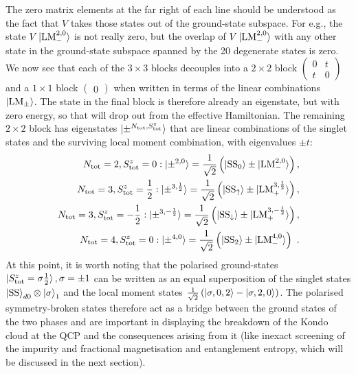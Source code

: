 \documentclass{iopart}
\begin{document}
The zero matrix elements at the far right of each line should be understood as the fact that \(V\) takes those states out of the ground-state subspace. For e.g., the state \(V\ket{\text{LM}_-^{2,0}}\) is not really zero, but the overlap of \(V\ket{\text{LM}_-^{2,0}}\) with any other state in the ground-state subspace spanned by the 20 degenerate states is zero. We now see that each of the \(3\times3\) blocks decouples into a \(2\times2\) block \(\begin{pmatrix} 0 & t \\ t & 0 \end{pmatrix} \)and a \(1\times1\) block \(\begin{pmatrix} 0 \end{pmatrix} \) when written in terms of the linear combinations \(\ket{\text{LM}_\pm}\). The state in the final block is therefore already an eigenstate, but with zero energy, so that will drop out from the effective Hamiltonian. The remaining \(2\times 2\) block has eigenstates \(\ket{\pm^{N_\text{tot},S_\text{tot}^z}}\) that are linear combinations of the singlet states and the surviving local moment combination, with eigenvalues \(\pm t\):
\begin{eqnarray}
	\label{new g-states}
	N_\text{tot} = 2, S_\text{tot}^z = 0: \ket{\pm^{2,0}} = \frac{1}{\sqrt 2}\left(\ket{\text{SS}_0} \pm \ket{\text{LM}_-^{2,0}}\right),\nonumber \\
	N_\text{tot} = 3, S_\text{tot}^z = \frac{1}{2}: \ket{\pm^{3,\frac{1}{2}}} = \frac{1}{\sqrt 2}\left(\ket{\text{SS}_\uparrow} \pm \ket{\text{LM}_+^{3,\frac{1}{2}}}\right),\nonumber \\
	N_\text{tot} = 3, S_\text{tot}^z = -\frac{1}{2}: \ket{\pm^{3,-\frac{1}{2}}} = \frac{1}{\sqrt 2}\left(\ket{\text{SS}_\downarrow} \pm \ket{\text{LM}_+^{3,-\frac{1}{2}}}\right), \nonumber\\
	N_\text{tot} = 4, S_\text{tot}^z = 0: \ket{\pm^{4,0}} = \frac{1}{\sqrt 2}\left(\ket{\text{SS}_2} \pm \ket{\text{LM}_-^{4,0}}\right)~.
\end{eqnarray}
At this point, it is worth noting that the polarised ground-states \(\ket{S_\text{tot}^z=\sigma\frac{1}{2}},\sigma=\pm 1\) can be written as an equal superposition of the singlet states \(\ket{\text{SS}}_{d0}\otimes\ket{\sigma}_1\) and the local moment states \(\frac{1}{\sqrt 2}\left(\ket{\sigma, 0, 2} - \ket{\sigma, 2, 0}\right)\). The polarised symmetry-broken states therefore act as a bridge between the ground states of the two phases and are important in displaying the breakdown of the Kondo cloud at the QCP and the consequences arising from it (like inexact screening of the impurity and fractional magnetisation and entanglement entropy, which will be discussed in the next section).
\end{document}
